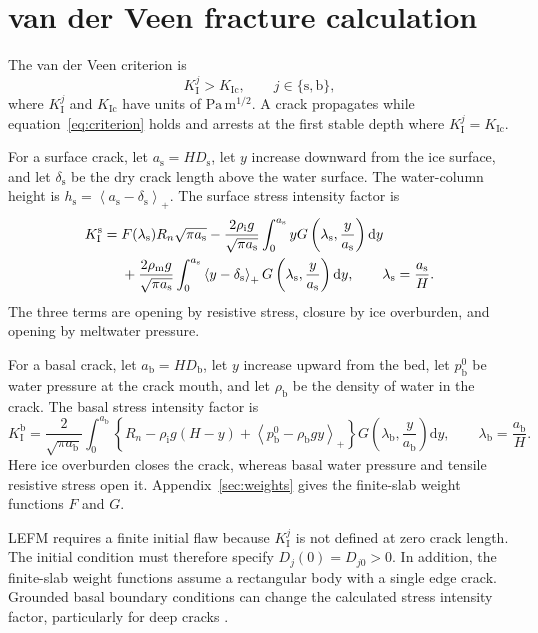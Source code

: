 \documentclass[11pt]{article}
\newcommand{\dd}{\mathrm{d}}
\newcommand{\pos}[1]{\left\langle #1\right\rangle_{+}}
\newcommand{\rmi}{\mathrm{i}}
\newcommand{\rms}{\mathrm{s}}
\newcommand{\rmb}{\mathrm{b}}
\newcommand{\KI}[1]{K_{\mathrm{I}}^{#1}}
\newcommand{\KIc}{K_{\mathrm{Ic}}}
\begin{document}
\section{van der Veen fracture calculation}

The van der Veen criterion is
\begin{equation}
 \KI{j}>\KIc,\qquad j\in\{\rms,\rmb\},
 \label{eq:criterion}
\end{equation}
where \(\KI{j}\) and \(\KIc\) have units of
\(\mathrm{Pa\,m^{1/2}}\).  A crack propagates while
equation~\eqref{eq:criterion} holds and arrests at the first stable depth where
\(\KI{j}=\KIc\).

For a surface crack, let \(a_{\rms}=HD_{\rms}\), let \(y\) increase downward
from the ice surface, and let \(\delta_{\rms}\) be the dry crack length above
the water surface.  The water-column height is
\(h_{\rms}=\pos{a_{\rms}-\delta_{\rms}}\).  The surface stress intensity factor
is
\begin{align}
 \KI{\rms}={}&F(\lambda_{\rms})R_n\sqrt{\pi a_{\rms}}
 -\frac{2\rho_{\rmi}g}{\sqrt{\pi a_{\rms}}}
  \int_0^{a_{\rms}}
  yG\left(\lambda_{\rms},\frac{y}{a_{\rms}}\right)\dd y
 \notag\\
 &+\frac{2\rho_{\mathrm{m}}g}{\sqrt{\pi a_{\rms}}}
  \int_0^{a_{\rms}}
  \pos{y-\delta_{\rms}}
  G\left(\lambda_{\rms},\frac{y}{a_{\rms}}\right)\dd y,
 \qquad
 \lambda_{\rms}=\frac{a_{\rms}}{H}.
 \label{eq:surface-sif}
\end{align}
The three terms are opening by resistive stress, closure by ice overburden,
and opening by meltwater pressure.

For a basal crack, let \(a_{\rmb}=HD_{\rmb}\), let \(y\) increase upward from
the bed, let \(p_{\rmb}^{0}\) be water pressure at the crack mouth, and let
\(\rho_{\rmb}\) be the density of water in the crack.  The basal stress
intensity factor is
\begin{equation}
 \KI{\rmb}
 =\frac{2}{\sqrt{\pi a_{\rmb}}}
  \int_0^{a_{\rmb}}
  \left\{
    R_n-\rho_{\rmi}g(H-y)
    +\pos{p_{\rmb}^{0}-\rho_{\rmb}gy}
  \right\}
  G\left(\lambda_{\rmb},\frac{y}{a_{\rmb}}\right)\dd y,
 \qquad
 \lambda_{\rmb}=\frac{a_{\rmb}}{H}.
 \label{eq:basal-sif}
\end{equation}
Here ice overburden closes the crack, whereas basal water pressure and tensile
resistive stress open it.  Appendix~\ref{sec:weights} gives the finite-slab
weight functions \(F\) and \(G\).

LEFM requires a finite initial flaw because \(\KI{j}\) is not defined at zero
crack length.  The initial condition must therefore specify
\(D_j(0)=D_{j0}>0\).  In addition, the finite-slab weight functions assume a
rectangular body with a single edge crack.  Grounded basal boundary conditions
can change the calculated stress intensity factor, particularly for deep
cracks \citep{jimenez2018}.
\end{document}
